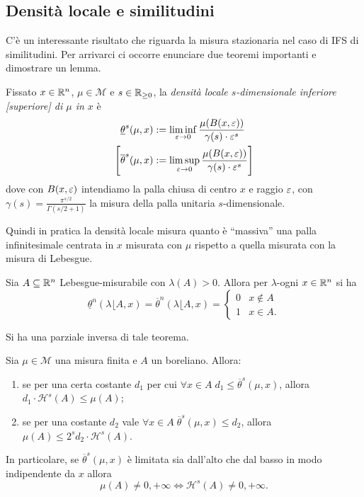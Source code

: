 \begin{esempio}
	
\end{esempio}

\subsection{Densità locale e similitudini}

C'è un interessante risultato che riguarda la misura stazionaria nel caso di IFS di similitudini. Per arrivarci ci occorre enunciare due teoremi importanti e dimostrare un lemma.

\begin{definizione}
	Fissato $x\in\mathbb{R}^{n}$, $\mu\in\mathcal M$ e $s\in\mathbb{R}_{\geq0}$, la \emph{densità locale $s$-dimensionale inferiore [superiore] di $\mu$ in $x$} è 
	\begin{align*}
		\underline\theta^{s}(\mu, x) &:= \liminf_{\varepsilon\to0} \frac{\mu(B(x,\varepsilon))}{\gamma(s)\cdot\varepsilon^{s}}\\
		\Bigg[\overline\theta^{s}(\mu, x) &:= \limsup_{\varepsilon\to0} \frac{\mu(B(x,\varepsilon))}{\gamma(s)\cdot\varepsilon^{s}}\Bigg]
	\end{align*}
	dove con $B(x,\varepsilon)$ intendiamo la palla chiusa di centro $x$ e raggio $\varepsilon$, con $\gamma(s) = \frac{\pi^{s/2}}{\Gamma(s/2 + 1)}$ la misura della palla unitaria $s$-dimensionale.
\end{definizione}
Quindi in pratica la densità locale misura quanto è ``massiva'' una palla infinitesimale centrata in $x$ misurata con $\mu$ rispetto a quella misurata con la misura di Lebesgue.

\begin{teorema}
	Sia $A\subseteq\mathbb{R}^{n}$ Lebesgue-misurabile con $\lambda(A)>0$. Allora per $\lambda$-ogni $x\in\mathbb{R}^{n}$ si ha 
	$$
	\underline\theta^{n}(\lambda\lfloor A, x) = \overline\theta^{n}(\lambda\lfloor A, x) = 
	\begin{cases}
		0 & x\not\in A\\
		1 & x\in A.
	\end{cases}$$
\end{teorema}

Si ha una parziale inversa di tale teorema. 

\begin{teorema}[Federer]
	Sia $\mu\in\mathcal M$ una misura finita e $A$ un boreliano. Allora:
	\begin{enumerate}
		\item se per una certa costante $d_{1}$ per cui $\forall x\in A\; d_{1} \leq \overline\theta^{s}(\mu,x)$, allora $d_{1}\cdot\mathcal H^{s}(A)\leq\mu(A)$;
		\item se per una costante $d_{2}$ vale $\forall x\in A\; \overline\theta^{s}(\mu,x)\leq d_{2}$, allora $\mu(A) \leq 2^{s}d_{2}\cdot\mathcal H^{s}(A)$.
	\end{enumerate}
	In particolare, se $\overline \theta^{s}(\mu, x)$ è limitata sia dall'alto che dal basso in modo indipendente da $x$ allora 
	$$\mu(A) \neq 0, +\infty \iff \mathcal H^{s}(A) \neq 0, +\infty.$$
\end{teorema}

